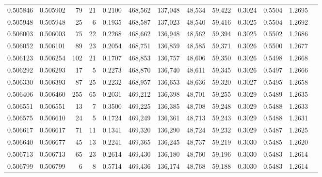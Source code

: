 \begin{tabular}{rrrrrrrrrrrrr}
0.505846 & 0.505902 &    79 &    21 &                                     0.2100 & 468,562 & 137,048 &  48,534 &  59,422 & 0.3024 & 0.5504 & 1.2695 \\
0.505948 & 0.505948 &    25 &     6 &                                     0.1935 & 468,587 & 137,023 &  48,540 &  59,416 & 0.3025 & 0.5504 & 1.2692 \\
0.506003 & 0.506003 &    75 &    22 &                                     0.2268 & 468,662 & 136,948 &  48,562 &  59,394 & 0.3025 & 0.5502 & 1.2686 \\
0.506052 & 0.506101 &    89 &    23 &                                     0.2054 & 468,751 & 136,859 &  48,585 &  59,371 & 0.3026 & 0.5500 & 1.2677 \\
0.506123 & 0.506254 &   102 &    21 &                                     0.1707 & 468,853 & 136,757 &  48,606 &  59,350 & 0.3026 & 0.5498 & 1.2668 \\
0.506292 & 0.506293 &    17 &     5 &                                     0.2273 & 468,870 & 136,740 &  48,611 &  59,345 & 0.3026 & 0.5497 & 1.2666 \\
0.506330 & 0.506393 &    87 &    25 &                                     0.2232 & 468,957 & 136,653 &  48,636 &  59,320 & 0.3027 & 0.5495 & 1.2658 \\
0.506406 & 0.506460 &   255 &    65 &                                     0.2031 & 469,212 & 136,398 &  48,701 &  59,255 & 0.3029 & 0.5489 & 1.2635 \\
0.506551 & 0.506551 &    13 &     7 &                                     0.3500 & 469,225 & 136,385 &  48,708 &  59,248 & 0.3029 & 0.5488 & 1.2633 \\
0.506575 & 0.506610 &    24 &     5 &                                     0.1724 & 469,249 & 136,361 &  48,713 &  59,243 & 0.3029 & 0.5488 & 1.2631 \\
0.506617 & 0.506617 &    71 &    11 &                                     0.1341 & 469,320 & 136,290 &  48,724 &  59,232 & 0.3029 & 0.5487 & 1.2625 \\
0.506640 & 0.506677 &    45 &    13 &                                     0.2241 & 469,365 & 136,245 &  48,737 &  59,219 & 0.3030 & 0.5485 & 1.2620 \\
0.506713 & 0.506713 &    65 &    23 &                                     0.2614 & 469,430 & 136,180 &  48,760 &  59,196 & 0.3030 & 0.5483 & 1.2614 \\
0.506799 & 0.506799 &     6 &     8 &                                     0.5714 & 469,436 & 136,174 &  48,768 &  59,188 & 0.3030 & 0.5483 & 1.2614 \\

\end{tabular}
